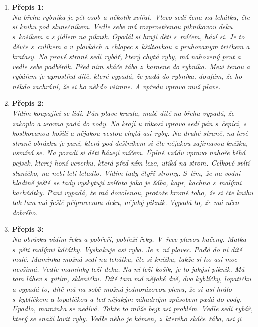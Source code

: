 \begin{enumerate}
	\item \textbf{Přepis 1:} \\
	      \emph{Na břehu rybníka je pět osob a několik zvířat. Vlevo sedí žena na lehátku, čte si knihu
		      pod slunečníkem. Vedle sebe má rozprostřenou piknikovou deku s košíkem a s jídlem
		      na piknik. Opodál si hrají děti s míčem, hází si. Je to děvče s culíkem a v plavkách a
		      chlapec s kšiltovkou a pruhovanym tričkem a kraťasy. Na pravé straně sedí rybář,
		      který chytá ryby, má nahozený prut a vedle sebe podběrák. Před ním skáče žába
		      z kamene do rybníka. Mezi ženou a rybářem je uprostřed dítě, které vypadá, že padá
		      do rybníka, doufám, že ho někdo zachrání, že si ho někdo všimne. A vpředu vpravo
		      muž plave.}
	\item \textbf{Přepis 2:}\\
	      \emph{Vidím koupající se lidi. Pán plave kraula, malé dítě na břehu vypadá, že zakoplo a
		      zrovna padá do vody. Na kraji u rákosí vpravo sedí pán s čepicí, s kostkovanou košilí a
		      nějakou vestou chytá asi ryby. Na druhé straně, na levé straně obrázku je paní, která
		      pod deštníkem si čte nějakou zajímavou knížku, usmívá se. Na pozadí si děti házejí
		      míčem. Úplně vzádu vpravo nahoře běhá pejsek, kterej honí veverku, která před ním
		      leze, utíká na strom. Celkově svítí sluníčko, na nebi letí letadlo. Vidím tady čtyři stromy.
		      S tím, že na vodní hladině ještě se tady vyskytují zvířata jako je žába, kapr, kachna
		      s malými kachňátky. Pani vypadá, že má dovolenou, protože kromě toho, že si čte
		      knihu tak tam má ještě připravenou deku, nějaký piknik. Vypadá to, že má něco
		      dobrého.}
	\item \textbf{Přepis 3:} \\
	      \emph{Na obrázku vidím řeku a pobřeří, pobřeží řeky. V řece plavou kačeny. Matka s pěti
		      malými káčátky. Vyskakuje asi ryba. Je v ní plavec. Padá do ní dítě malé. Maminka
		      možná sedí na lehátku, čte si knížku, takže si ho asi moc nevšímá. Vedle maminky leží
		      deka. Na ní leží košík, je to jakýsi piknik. Má tam láhev s pitím, skleničku. Dítě tam má
		      nějaké dvě, dva kyblíčky, lopatičku a vypadá to, dítě má na sobě možná jednorázovou
		      plenu, že si asi hrálo s kyblíčkem a lopatičkou a teď nějakým záhadným způsobem
		      padá do vody. Upadlo, maminka se nedívá. Takže to může bejt asi problém. Vedle
		      sedí rybář, který se snaží lovit ryby. Vedle něho je kámen, z kterého skáče žába, asi ji
}
\end{enumerate}

